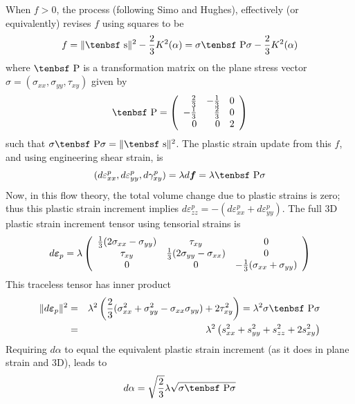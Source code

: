 \documentclass[11pt]{article}
\renewcommand{\vec}[1]{\boldsymbol{#1}}
\def\dev{\hbox{\tenbsf s}}
\def\dpl{d \vec{\varepsilon}_{p}}
\def\df{d \vec{f}}
\def\P{\hbox{\tenbsf P}}
\def\s#1{\sigma_{#1}}
\begin{document}
When $f>0$, the process (following Simo and Hughes), effectively (or equivalently) revises $f$ using squares to be
\begin{equation}
       f = \|\dev\|^2 - {2\over 3}K^2(\alpha) = \sigma \P\sigma - {2\over 3}K^2(\alpha)
\end{equation}
where $\P$ is a transformation matrix on the plane stress vector $\sigma = (\s{xx}, \s{yy}, \tau_{xy})$ given by
\begin{equation}
          \P = \left( \begin{array}{rrr}
                    {2\over 3} & -{1\over 3} & 0 \\ 
                    -{1\over 3} & {2\over 3} & 0 \\ 0 & 0 & 2 \end{array}\right)
\end{equation}
such that $\sigma \P\sigma = \|\dev\|^2$. The plastic strain update from this $f$, and using engineering shear strain, is
\begin{equation}
     (d\varepsilon_{xx}^p,  d\varepsilon_{yy}^p, d\gamma_{xy}^p) = \lambda \df = \lambda \P\sigma
\end{equation}
Now, in this flow theory, the total volume change due to plastic strains is zero; thus this plastic strain increment implies $d\varepsilon_{zz}^p = - (d\varepsilon_{xx}^p + d\varepsilon_{yy}^p)$. The full 3D plastic strain increment tensor using tensorial strains is
\begin{equation}
          \dpl = \lambda \left( \begin{array}{ccc}
                    {1\over 3}(2\s{xx}-\s{yy})& \tau_{xy} & 0 \\ 
                    \tau_{xy} & {1\over 3}(2\s{yy}-\s{xx}) & 0 \\ 0 & 0 & -{1\over 3}(\s{xx}+\s{yy}) \end{array}\right)
\end{equation}
This traceless tensor has inner product
\begin{eqnarray}
  \|\dpl\|^2 & = & \lambda^2 \left( {2\over 3}(\s{xx}^2 + \s{yy}^2 - \s{xx}\s{yy}) + 2\tau_{xy}^2\right) = \lambda^2 \sigma \P\sigma \\
      & = & \lambda^2 \left( s_{xx}^2 + s_{yy}^2 + s_{zz}^2 + 2s_{xy}^2\right)
\end{eqnarray}
Requiring $d\alpha$ to equal the equivalent plastic strain increment (as it does in plane strain and 3D), leads to
\begin{equation}
        d\alpha = \sqrt{2\over3}\lambda \sqrt{\sigma \P\sigma}
\end{equation}
\end{document}
